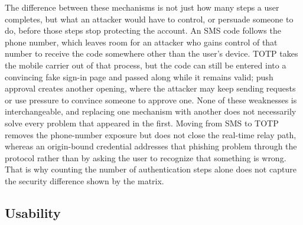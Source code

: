\documentclass[sigconf]{acmart}
\begin{document}
The difference between these mechanisms is not just how many steps a user completes, but what an attacker would have to control, or persuade someone to do, before those steps stop protecting the account. An SMS code follows the phone number, which leaves room for an attacker who gains control of that number to receive the code somewhere other than the user's device. TOTP takes the mobile carrier out of that process, but the code can still be entered into a convincing fake sign-in page and passed along while it remains valid; push approval creates another opening, where the attacker may keep sending requests or use pressure to convince someone to approve one. None of these weaknesses is interchangeable, and replacing one mechanism with another does not necessarily solve every problem that appeared in the first. Moving from SMS to TOTP removes the phone-number exposure but does not close the real-time relay path, whereas an origin-bound credential addresses that phishing problem through the protocol rather than by asking the user to recognize that something is wrong. That is why counting the number of authentication steps alone does not capture the security difference shown by the matrix.

\begin{table}[t]
  \caption{Day-to-day usability of five second factors, from Reese et al.~\cite{reese:2019:2fa}. SUS is the System Usability Scale; higher is better. Biometric MFA was not tested and is recorded as not measured.}
  \label{tab:usability}
\end{table}

\subsection{Usability}
\end{document}

